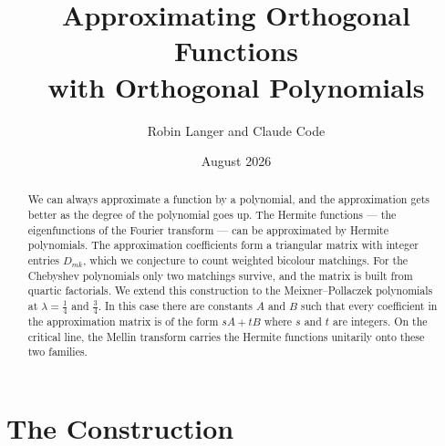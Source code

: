 \documentclass[11pt,a4paper]{article}
\title{\textbf{Approximating Orthogonal Functions\\ with Orthogonal Polynomials}}
\author{Robin Langer and Claude Code}
\date{August 2026}
\theoremstyle{definition}
\begin{document}
\maketitle

\begin{abstract}
We can always approximate a function by a polynomial, and the
approximation gets better as the degree of the polynomial goes up.
The Hermite functions --- the eigenfunctions of the Fourier
transform --- can be approximated by Hermite polynomials. The
approximation coefficients form a triangular matrix with integer
entries $D_{mk}$, which we conjecture to count weighted bicolour
matchings. For the Chebyshev polynomials only two matchings survive,
and the matrix is built from quartic factorials. We extend this
construction to the Meixner--Pollaczek
polynomials at $\lambda = \tfrac14$ and $\tfrac34$. In this case
there are constants $A$ and $B$ such that every coefficient in the
approximation matrix is of the form $sA + tB$ where $s$ and $t$ are
integers. On the critical line, the Mellin transform carries the
Hermite functions unitarily onto these two families.
\end{abstract}

\section{The Construction}
\end{document}
